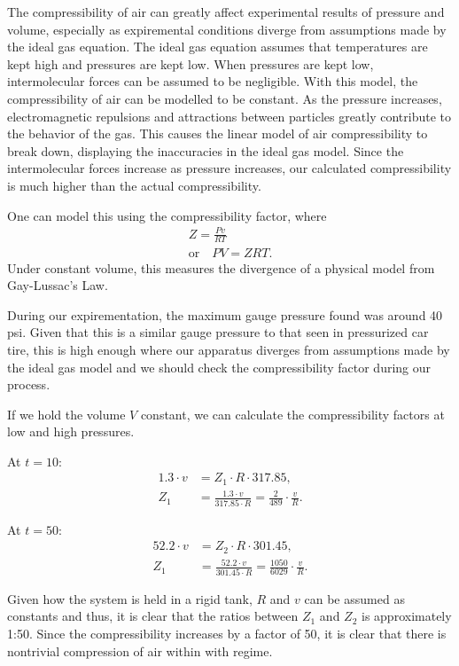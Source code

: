 \documentclass[12pt,letterpaper]{article}
\begin{document}
The compressibility of air can greatly affect experimental results of pressure and volume, especially as expiremental conditions diverge from assumptions made by the ideal gas equation. The ideal gas equation assumes that temperatures are kept high and pressures are kept low. When pressures are kept low, intermolecular forces can be assumed to be negligible. With this model, the compressibility of air can be modelled to be constant. As the pressure increases, electromagnetic repulsions and attractions between particles greatly contribute to the behavior of the gas. This causes the linear model of air compressibility to break down, displaying the inaccuracies in the ideal gas model. Since the intermolecular forces increase as pressure increases, our calculated compressibility is much higher than the actual compressibility.

One can model this using the compressibility factor, where
\[
\begin{gathered}
    Z = \frac{Pv}{RT} \\
    \text{or}\quad PV = ZRT.
\end{gathered}
\]
Under constant volume, this measures the divergence of a physical model from Gay-Lussac's Law.

During our expirementation, the maximum gauge pressure found was around 40 psi. Given that this is a similar gauge pressure to that seen in pressurized car tire, this is high enough where our apparatus diverges from assumptions made by the ideal gas model and we should check the compressibility factor during our process.

If we hold the volume \(V\) constant, we can calculate the compressibility factors at low and high pressures.

At \(t = 10\):
\begin{align*}
    1.3 \cdot v &= Z_1 \cdot R \cdot 317.85, \\
    Z_1 &= \frac{1.3 \cdot v}{317.85 \cdot R}
        = \frac{2}{489} \cdot \frac{v}{R}.
\end{align*}

At \(t = 50\):
\begin{align*}
    52.2 \cdot v &= Z_2 \cdot R \cdot 301.45, \\
    Z_1 &= \frac{52.2 \cdot v}{301.45 \cdot R}
        = \frac{1050}{6029} \cdot \frac{v}{R}.
\end{align*}

Given how the system is held in a rigid tank, $R$ and $v$ can be assumed as constants and thus, it is clear that the ratios between $Z_1$ and $Z_2$ is approximately 1:50. \@ Since the compressibility increases by a factor of 50, it is clear that there is nontrivial compression of air within with regime. \@ 
\end{document}
